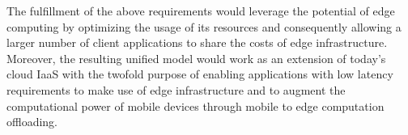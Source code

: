 The fulfillment of the above requirements would leverage the potential of edge computing by optimizing the usage of its resources and consequently allowing a larger number of client applications to share the costs of edge infrastructure. Moreover, the resulting unified model would work as an extension of today’s cloud IaaS with the twofold purpose of enabling applications with low latency requirements to make use of edge infrastructure and to augment the computational power of mobile devices through mobile to edge computation offloading. 